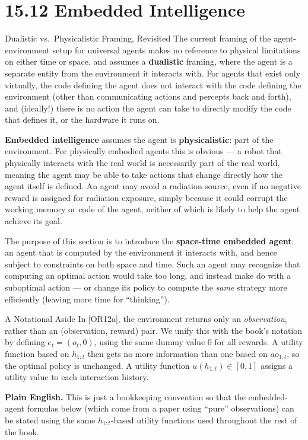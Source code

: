 \documentclass[aspectratio=169,10pt]{beamer}
\begin{document}
\section{15.12 Embedded Intelligence}

\begin{frame}{Dualistic vs.\ Physicalistic Framing, Revisited}
  The current framing of the agent-environment setup for universal
  agents makes no reference to physical limitations on either time or
  space, and assumes a \textbf{dualistic} framing, where the agent is a
  separate entity from the environment it interacts with. For agents that
  exist only virtually, the code defining the agent does not interact
  with the code defining the environment (other than communicating
  actions and percepts back and forth), and (ideally!) there is no action
  the agent can take to directly modify the code that defines it, or the
  hardware it runs on.

  \vspace{0.4em}
  \textbf{Embedded intelligence} assumes the agent is
  \textbf{physicalistic}: part of the environment. For physically embodied
  agents this is obvious --- a robot that physically interacts with the
  real world is necessarily part of the real world, meaning the agent may
  be able to take actions that change directly how the agent itself is
  defined. An agent may avoid a radiation source, even if no negative
  reward is assigned for radiation exposure, simply because it could
  corrupt the working memory or code of the agent, neither of which is
  likely to help the agent achieve its goal.

  \vspace{0.4em}
  The purpose of this section is to introduce the \textbf{space-time
  embedded agent}: an agent that is computed by the environment it
  interacts with, and hence subject to constraints on both space and
  time. Such an agent may recognize that computing an optimal action would
  take too long, and instead make do with a suboptimal action --- or
  change its policy to compute the \emph{same} strategy more efficiently
  (leaving more time for ``thinking'').
\end{frame}

\begin{frame}{A Notational Aside}
  In [OR12a], the environment returns only an \emph{observation}, rather
  than an (observation, reward) pair. We unify this with the book's
  notation by defining $e_t=(o_t,0)$, using the same dummy value $0$ for
  all rewards. A utility function based on $h_{1:t}$ then gets no more
  information than one based on $ao_{1:t}$, so the optimal policy is
  unchanged. A utility function $u(h_{1:t})\in[0,1]$ assigns a utility
  value to each interaction history.

  \vspace{0.4em}
  \textbf{Plain English.} This is just a bookkeeping convention so that
  the embedded-agent formulas below (which come from a paper using
  ``pure'' observations) can be stated using the same $h_{1:t}$-based
  utility functions used throughout the rest of the book.
\end{frame}
\end{document}
